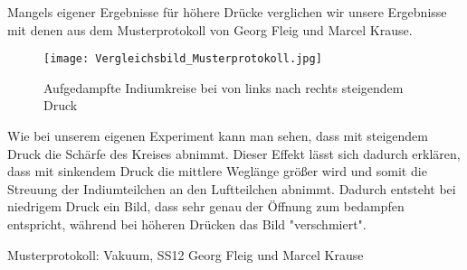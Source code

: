\documentclass[a4paper,12pt]{scrartcl}
\begin{document}
Mangels eigener Ergebnisse für höhere Drücke verglichen wir unsere Ergebnisse mit denen aus dem Musterprotokoll von Georg Fleig und Marcel Krause.

\begin{figure}
	\label{vergleich}
	\centering
	\texttt{[image: Vergleichsbild\_Musterprotokoll.jpg]}
	\caption{Aufgedampfte Indiumkreise bei von links nach rechts steigendem Druck\cite{Dampfen}}
\end{figure}

Wie bei unserem eigenen Experiment kann man sehen, dass mit steigendem Druck die Schärfe des Kreises abnimmt. Dieser Effekt lässt sich dadurch erklären, dass mit sinkendem Druck die mittlere Weglänge größer wird und somit die Streuung der Indiumteilchen an den Luftteilchen abnimmt. Dadurch entsteht bei niedrigem Druck ein Bild, dass sehr genau der Öffnung zum bedampfen entspricht, während bei höheren Drücken das Bild "verschmiert".

\begin{thebibliography}{999}
	 Musterprotokoll: Vakuum, SS12 Georg Fleig und Marcel Krause
\end{thebibliography}
\end{document}
